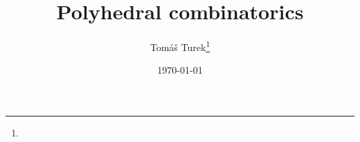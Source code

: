 


\usepackage{babel}

\title{Polyhedral combinatorics}
\author{Tomáš Turek\thanks{\INFO}}
\date{\today}


	\maketitle

